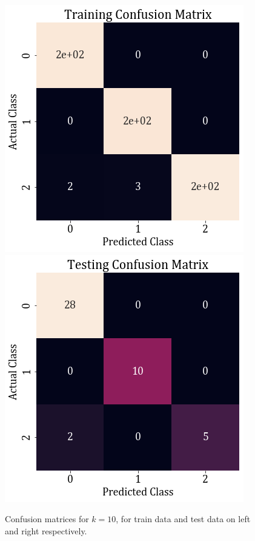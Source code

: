 \documentclass[11pt,a4paper]{article}
\begin{document}
\begin{figure}[H]
    \includegraphics[scale=0.6]{images/1B/1b_conf_mat_nb_train.png}
    \includegraphics[scale=0.6]{images/1B/1b_conf_mat_nb_test.png}
    \caption{Confusion matrices for $k=10$, for train data and test data on left and right respectively.}
    \label{fig:1b_cm_nb}
\end{figure}
\end{document}
